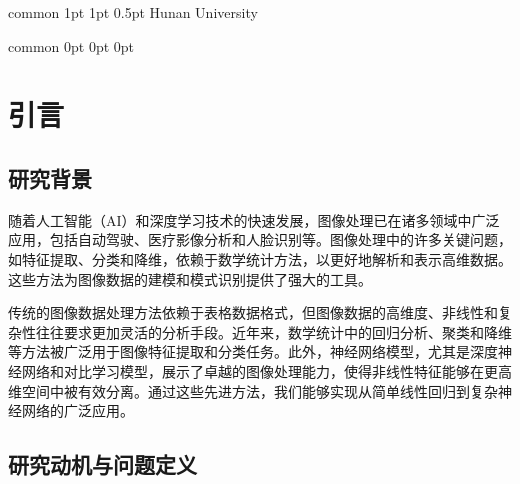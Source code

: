 \documentclass[
    report,     %
    oneside,    %
    UTF8,       %
    zihao=-4    %
]{config} %
\begin{document}
\Header
    {common} %
    {1pt} %
    {1pt} %
    {0.5pt} %
    {Hunan University} %
    {} %
    {\currentChapterInfo} %


\Footer
    {common} %
    {0pt} %
    {0pt} %
    {0pt} %
    {} %
    {\thepage} %
    {} %


\SetArabicPageNumber{} %






\chapter{引言}

\section{研究背景}

随着人工智能（AI）和深度学习技术的快速发展，图像处理已在诸多领域中广泛应用，包括自动驾驶、医疗影像分析和人脸识别等。图像处理中的许多关键问题，如特征提取、分类和降维，依赖于数学统计方法，以更好地解析和表示高维数据。这些方法为图像数据的建模和模式识别提供了强大的工具。

传统的图像数据处理方法依赖于表格数据格式，但图像数据的高维度、非线性和复杂性往往要求更加灵活的分析手段。近年来，数学统计中的回归分析、聚类和降维等方法被广泛用于图像特征提取和分类任务。此外，神经网络模型，尤其是深度神经网络和对比学习模型，展示了卓越的图像处理能力，使得非线性特征能够在更高维空间中被有效分离。通过这些先进方法，我们能够实现从简单线性回归到复杂神经网络的广泛应用。

\section{研究动机与问题定义}
\end{document}
